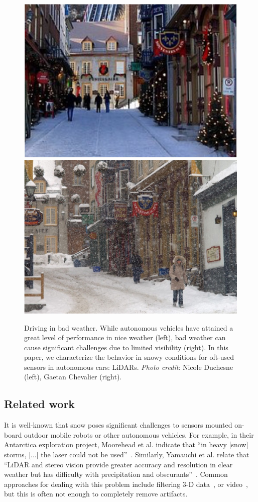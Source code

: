 \begin{figure}
    \begin{center}
        \includegraphics[width=.48\linewidth]{./img/chap_lidar/summer.jpg}
        \includegraphics[width=.48\linewidth]{./img/chap_lidar/winter.jpg}
    \end{center}
    \caption{Driving in bad weather. While autonomous vehicles have attained a great level of performance in nice weather (left), bad weather can cause significant challenges due to limited visibility (right). In this paper, we characterize the behavior in snowy conditions for oft-used sensors in autonomous cars: LiDARs. \emph{Photo credit}: Nicole Duchesne (left), Gaetan Chevalier (right).}
    \label{fig:good-bad-weather}
\end{figure}

\subsection{Related work}

It is well-known that snow poses significant challenges to sensors mounted on-board outdoor mobile robots or other autonomous vehicles. For example, in their Antarctica exploration project, Moorehead et al. indicate that ``in heavy [snow] storms, [...] the laser could not be used''~\cite{Moorehead_1999_2122}. Similarly, Yamauchi et al. relate that ``LiDAR and stereo vision provide greater accuracy and resolution in clear weather but has difficulty with precipitation and obscurants''~\cite{yamauchi2010fusing}. Common approaches for dealing with this problem include filtering 3-D data~\cite{Moorehead_1999_2122}, or video~\cite{barnum2010analysis}, but this is often not enough to completely remove artifacts.

